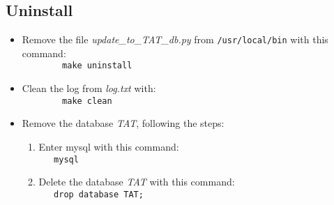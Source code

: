 \documentclass[12pt]{article}    %
\begin{document}
 \subsection{Uninstall}
 \begin{itemize}
  \item Remove the file {\it update\_to\_TAT\_db.py} from \verb|/usr/local/bin|  with this command:\\
  \verb|		make uninstall|
  \item Clean the log from {\it log.txt} with:\\
  \verb|		make clean|
  \item Remove the database {\it TAT}, following the steps:
  \begin{enumerate}
   \item Enter mysql with this command:\\
   \verb|	mysql|
   \item Delete the database {\it TAT} with this command:\\
   \verb|	drop database TAT;| 
  \end{enumerate}			  
 \end{itemize}
\end{document}
